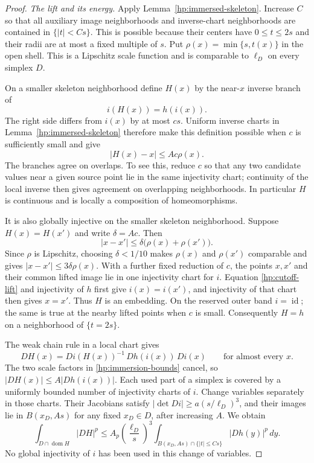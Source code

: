 \documentclass[11pt]{article}
\numberwithin{equation}{section}
\theoremstyle{definition}
\theoremstyle{remark}
\newcommand{\Id}{\operatorname{id}}
\begin{document}
\begin{proof}
\emph{The lift and its energy.}
Apply Lemma~\ref{hp:immersed-skeleton}.  Increase $C$ so that all
auxiliary image neighborhoods and inverse-chart neighborhoods are
contained in $\{|t|<Cs\}$.  This is possible because their centers have
$0\leq t\leq2s$ and their radii are at most a fixed multiple of $s$.
Put $\rho(x)=\min\{s,t(x)\}$ in the open shell.  This is a Lipschitz
scale function and is comparable to $\ell_D$ on every simplex $D$.

On a smaller skeleton neighborhood define $H(x)$ by the near-$x$
inverse branch of
\begin{equation}\label{hp:cutoff-lift}
 i(H(x))=h(i(x)).
\end{equation}
The right side differs from $i(x)$ by at most $cs$.  Uniform inverse
charts in Lemma~\ref{hp:immersed-skeleton} therefore make this
definition possible when $c$ is sufficiently small and give
\begin{equation}\label{hp:lift-displacement}
 |H(x)-x|\leq A c\rho(x).
\end{equation}
The branches agree on overlaps.  To see this, reduce $c$ so that any
two candidate values near a given source point lie in the same
injectivity chart; continuity of the local inverse then gives agreement
on overlapping neighborhoods.  In particular $H$ is continuous and
is locally a composition of homeomorphisms.

It is also globally injective on the smaller skeleton neighborhood.
Suppose $H(x)=H(x')$ and write $\delta=Ac$.  Then
\[
 |x-x'|\leq\delta\bigl(\rho(x)+\rho(x')\bigr).
\]
Since $\rho$ is Lipschitz, choosing $\delta<1/10$ makes $\rho(x)$ and
$\rho(x')$ comparable and gives $|x-x'|\leq3\delta\rho(x)$.
With a further fixed reduction of $c$, the points $x,x'$ and their
common lifted image lie in one injectivity chart for $i$.  Equation
\eqref{hp:cutoff-lift} and injectivity of $h$ first give
$i(x)=i(x')$, and injectivity of that chart then gives $x=x'$.
Thus $H$ is an embedding.  On the reserved outer band $i=\Id$; the
same is true at the nearby lifted points when $c$ is small.  Consequently
$H=h$ on a neighborhood of $\{t=2s\}$.

The weak chain rule in a local chart gives
\[
 DH(x)=Di(H(x))^{-1}\,Dh(i(x))\,Di(x)
 \qquad\text{for almost every }x.
\]
The two scale factors in \eqref{hp:immersion-bounds} cancel, so
$|DH(x)|\leq A|Dh(i(x))|$.  Each used part of a simplex is covered by
a uniformly bounded number of injectivity charts of $i$.  Change
variables separately in those charts.  Their Jacobians satisfy
$|\det Di|\geq a(s/\ell_D)^3$, and their images lie in
$B(x_D,As)$ for any fixed $x_D\in D$, after increasing $A$.  We obtain
\begin{equation}\label{hp:lift-cell-energy}
 \int_{D\cap\operatorname{dom}H}|DH|^p
 \leq A_p\left(\frac{\ell_D}{s}\right)^3
       \int_{B(x_D,As)\cap\{|t|\leq Cs\}}|Dh(y)|^p\,dy.
\end{equation}
No global injectivity of $i$ has been used in this change of variables.


\end{proof}
\end{document}
